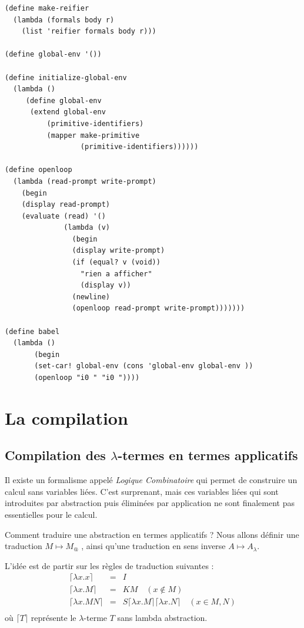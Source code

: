 \documentclass[11pt]{book}
\begin{document}
\begin{footnotesize}
\begin{Verbatim}
(define make-reifier
  (lambda (formals body r)
    (list 'reifier formals body r)))

(define global-env '())

(define initialize-global-env
  (lambda ()
     (define global-env
      (extend global-env 
          (primitive-identifiers)
          (mapper make-primitive
                  (primitive-identifiers)))))) 

(define openloop
  (lambda (read-prompt write-prompt)
    (begin 
    (display read-prompt)
    (evaluate (read) '()
              (lambda (v)
                (begin
                (display write-prompt)
                (if (equal? v (void))
                  "rien a afficher"
                  (display v))
                (newline)
                (openloop read-prompt write-prompt)))))))

(define babel
  (lambda ()
       (begin
       (set-car! global-env (cons 'global-env global-env ))
       (openloop "i0 " "i0 "))))
\end{Verbatim}
\end{footnotesize}


\chapter{La compilation}
\section{Compilation des $\lambda$-termes en termes applicatifs}
Il existe un formalisme appelé \textit{Logique Combinatoire} qui permet de construire
un calcul sans variables liées. 
C'est surprenant, mais ces variables liées qui sont introduites par abstraction puis éliminées par application
ne sont finalement pas essentielles pour le calcul.

Comment traduire une abstraction en termes applicatifs ? 
Nous allons définir une traduction $M\mapsto  M_@$ , ainsi qu'une traduction en sens inverse
$A\mapsto A_\lambda$.

L'idée est de partir sur les règles de traduction suivantes :
\[
\begin{array}{lcl}
	\lceil \lambda x . x \rceil &=& I \\
	\lceil \lambda x . M \rceil &=& K M \quad (x \notin M) \\
	\lceil \lambda x . M N \rceil &=& S \lceil \lambda x . M \rceil \lceil \lambda x . N \rceil \quad (x \in M,N) \\
\end{array}
\]
où $ \lceil T \rceil$ représente le $\lambda$-terme $T$ sans lambda abstraction. 
\end{document}

